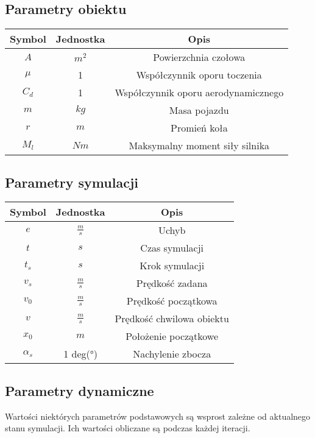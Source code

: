 \documentclass[12pt,a4paper]{article}
\begin{document}
	\subsection{Parametry obiektu}
	\begin{center}
		\begin{tabular}{|c|c|c|}
			\hline
			Symbol & Jednostka & Opis \\
			\hline
			\hline
			$A$ & $m^2$ & Powierzchnia czołowa \\
			\hline
			$\mu$ & 1 & Współczynnik oporu toczenia \\
			\hline
			$C_d$ & 1 & Współczynnik oporu aerodynamicznego \\
			\hline
			$m$ & $kg$ & Masa pojazdu \\
			\hline
			$r$ & $m$ & Promień koła \\
			\hline
			$M_l$ & $Nm$ & Maksymalny moment siły silnika \\
			\hline
		\end{tabular}
	\end{center}

	\subsection{Parametry symulacji}
	\begin{center}
		\begin{tabular}{|c|c|c|}
			\hline
			Symbol & Jednostka & Opis \\
			\hline
			\hline
			$e$ & $\frac{m}{s}$ & Uchyb \\
			\hline
			$t$ & $s$ & Czas symulacji \\
			\hline
			$t_s$ & $s$ & Krok symulacji \\
			\hline
			$v_s$ & $\frac{m}{s}$ & Prędkość zadana \\
			\hline
			$v_0$ & $\frac{m}{s}$ & Prędkość początkowa \\
			\hline
			$v$ & $\frac{m}{s}$ & Prędkość chwilowa obiektu \\
			\hline
			$x_0$ & $m$ & Położenie początkowe \\
			\hline
			$\alpha_s$ & 1 deg(°) & Nachylenie zbocza \\
			\hline
		\end{tabular}
	\end{center}
	
	\subsection{Parametry dynamiczne}
	Wartości niektórych parametrów podstawowych są wsprost zależne od aktualnego stanu symulacji. Ich wartości obliczane są podczas każdej iteracji.
	
\end{document}
